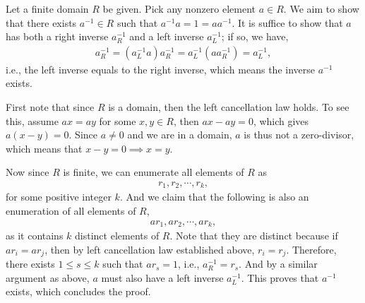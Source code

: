 \documentclass[12pt]{article}
\begin{document}
\begin{fproof}[Jacobson 2.2.1]
  Let a finite domain \(R\) be given.
  Pick any nonzero element \(a \in R\). We aim to show that there exists \(a^{-1} \in R\) such that \(a^{-1}a = 1 = aa^{-1}\).
  It is suffice to show that \(a\) has both a right inverse \(a^{-1}_R\) and a left inverse \(a^{-1}_L\); if so, we have,
  \begin{align*}
    a^{-1}_R = (a^{-1}_La)a^{-1}_R = a^{-1}_L(aa^{-1}_R) = a^{-1}_L,
  \end{align*}
  i.e., the left inverse equals to the right inverse, which means the inverse \(a^{-1}\) exists.

  First note that since \(R\) is a domain, then the left cancellation law holds. To see this, assume \(ax = ay\) for some \(x,y \in R\), then \(ax - ay = 0\), which gives \(a(x-y) = 0\). Since \(a \neq 0\) and we are in a domain, \(a\) is thus not a zero-divisor, which means that \(x-y=0 \implies x = y\).

  Now since \(R\) is finite, we can enumerate all elements of \(R\) as 
  \begin{align*}
    r_1, r_2, \cdots, r_k,
  \end{align*}
  for some positive integer \(k\).
  And we claim that the following is also an enumeration of all elements of \(R\),
  \begin{align*}
    ar_1, ar_2, \cdots, ar_k,
  \end{align*}
  as it contains \(k\) distinct elements of \(R\).
  Note that they are distinct because if \(ar_i = ar_j\), then by left cancellation law established above, \(r_i = r_j\).
  Therefore, there exists \(1 \leq s \leq k\) such that \(ar_s = 1\), i.e., \(a^{-1}_R = r_s\).
  And by a similar argument as above, \(a\) must also have a left inverse \(a^{-1}_L\). 
  This proves that \(a^{-1}\) exists, which concludes the proof.
\end{fproof}
\newpage
\end{document}
